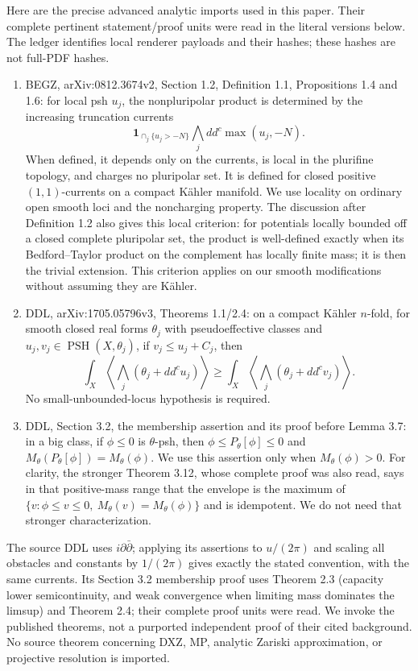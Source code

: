 \documentclass[11pt]{article}
\theoremstyle{remark}\newtheorem{remark}[theorem]{Remark}
\newcommand{\ddc}{dd^c}
\newcommand{\PSH}{\operatorname{PSH}}
\begin{document}
Here are the precise advanced analytic imports used in this paper.
Their complete pertinent statement/proof units were read in the literal
versions below. The ledger identifies local renderer payloads and
their hashes; these hashes are not full-PDF hashes.
\begin{enumerate}
\item BEGZ, arXiv:0812.3674v2, Section 1.2, Definition 1.1,
Propositions 1.4 and 1.6: for local psh $u_j$, the nonpluripolar
product is determined by the increasing truncation currents
\[
 \mathbf1_{\cap_j\{u_j>-N\}}\bigwedge_j
 \ddc\max(u_j,-N).
\]
When defined, it depends only on the currents, is local in the
plurifine topology, and charges no pluripolar set.
It is defined for closed positive $(1,1)$-currents on a compact
K\"ahler manifold. We use locality on ordinary open smooth loci
and the noncharging property. The discussion after Definition 1.2
also gives this local criterion: for potentials locally bounded off
a closed complete pluripolar set, the product is well-defined exactly
when its Bedford--Taylor product on the complement has locally finite
mass; it is then the trivial extension. This criterion applies on our
smooth modifications without assuming they are K\"ahler.
\item DDL, arXiv:1705.05796v3, Theorems 1.1/2.4:
on a compact K\"ahler $n$-fold, for smooth closed real forms
$\theta_j$ with pseudoeffective classes and
$u_j,v_j\in\PSH(X,\theta_j)$, if $v_j\leq u_j+C_j$, then
\[
 \int_X\left\langle\bigwedge_j(\theta_j+\ddc u_j)\right\rangle
 \geq
 \int_X\left\langle\bigwedge_j(\theta_j+\ddc v_j)\right\rangle.
 \tag{1.2}
\]
No small-unbounded-locus hypothesis is required.
\item DDL, Section 3.2, the membership assertion and its proof before
Lemma 3.7: in a big class, if $\phi\leq0$ is $\theta$-psh, then
$\phi\leq P_\theta[\phi]\leq0$ and
$M_\theta(P_\theta[\phi])=M_\theta(\phi)$.
We use this assertion only when $M_\theta(\phi)>0$.
For clarity, the stronger Theorem 3.12, whose complete proof was also
read, says in that positive-mass range that the envelope is the
maximum of
$\{v:\phi\leq v\leq0,\ M_\theta(v)=M_\theta(\phi)\}$ and is idempotent.
We do not need that stronger characterization.
\end{enumerate}
The source DDL uses $i\partial\bar\partial$; applying its assertions to
$u/(2\pi)$ and scaling all obstacles and constants by $1/(2\pi)$
gives exactly the stated convention, with the same currents.
Its Section 3.2 membership proof uses Theorem 2.3 (capacity lower
semicontinuity, and weak convergence when limiting mass dominates
the limsup) and Theorem 2.4; their complete proof units were read.
We invoke the published theorems, not a purported independent proof
of their cited background. No source theorem concerning DXZ, MP,
analytic Zariski approximation, or projective resolution is imported.
\end{document}
